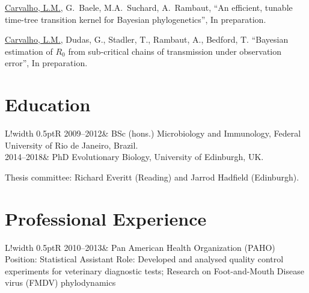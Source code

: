 \documentclass[10pt]{article}
\newcommand\VRule{\color{lightgray}\vrule width 0.5pt}
\begin{document}
\underline{Carvalho, L.M.}, G.~Baele, M.A.~Suchard, A.~Rambaut, ``{A}n efficient, tunable time-tree transition kernel for Bayesian phylogenetics'', In preparation.

\underline{Carvalho, L.M.}, Dudas, G., Stadler, T., Rambaut, A., Bedford, T.  ``Bayesian estimation of $R_0$ from sub-critical chains of transmission under observation error'', In preparation.

\newpage
\section*{Education}
\begin{tabular}{L!{\VRule}R}
2009--2012& BSc (hons.) Microbiology and Immunology, Federal University of Rio de Janeiro, Brazil.\\
2014--2018& PhD Evolutionary Biology, University of Edinburgh, UK.

Thesis committee: Richard Everitt (Reading) and Jarrod Hadfield (Edinburgh).
\end{tabular}

\section*{Professional Experience}
\begin{tabular}{L!{\VRule}R}
2010--2013&{
Pan American Health Organization (PAHO)\newline
Position: Statistical Assistant\newline
Role: Developed and analysed quality control experiments for veterinary diagnostic tests;\newline
Research on Foot-and-Mouth Disease virus (FMDV) phylodynamics 
}
\end{tabular}
\end{document}
